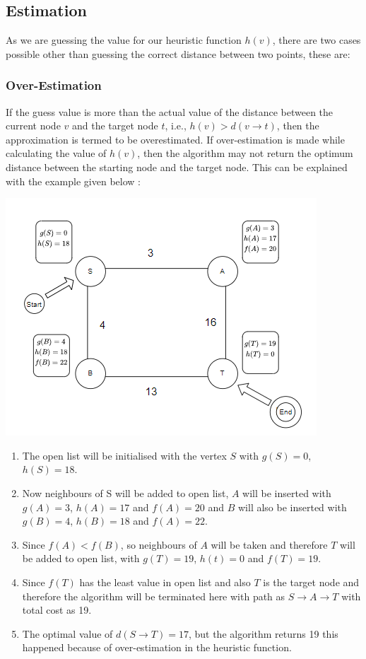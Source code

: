 \documentclass{article}
\theoremstyle{definition}
\begin{document}
\subsection{Estimation}
As we are guessing the value for our heuristic function $h(v)$, there are two cases possible other than guessing the correct distance between two points, these are:
\subsubsection{Over-Estimation}
If the guess value is more than the actual value of the distance between the current node $v$ and the target node $t$, i.e., $h(v) > d(v \rightarrow t)$,  then the approximation is termed to be overestimated. If over-estimation is made while calculating the value of $h(v)$, then the algorithm may not return the optimum distance between the starting node and the target node. This can be explained with the example given below :
\begin{center}
    \includegraphics[scale = 0.9]{Over-Estimation.png}
\end{center}
\begin{enumerate}
    \item The open list will be initialised with the vertex $S$ with $g(S)=0$, $h(S)=18$.
    \item Now neighbours of S will be added to open list, $A$ will be inserted with $g(A) = 3$, $h(A) = 17$ and $f(A) = 20$ and $B$ will also be inserted with $g(B) = 4$, $h(B) = 18$ and $f(A) = 22$. 
    \item Since $f(A) < f(B)$, so neighbours of $A$ will be taken and therefore $T$ will be added to open list, with $g(T) = 19$, $h(t) = 0$ and $f(T) = 19$.
    \item Since $f(T)$ has the least value in open list and also $T$ is the target node and therefore the algorithm will be terminated here with path as $S \longrightarrow A \longrightarrow  T$ with total cost as 19.
    \item The optimal value of $d(S \longrightarrow T) = 17$, but the algorithm returns
19 this happened because of over-estimation in the heuristic function.
\end{enumerate}
\newpage
\end{document}

